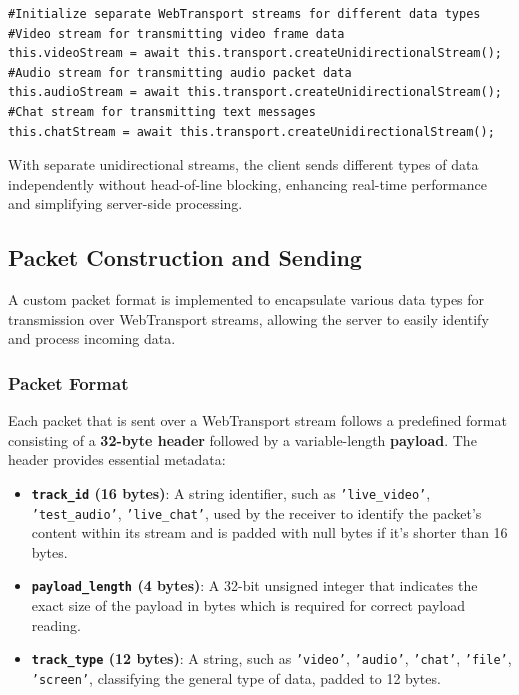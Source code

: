 \begin{lstlisting}[breaklines=true,basicstyle=\small\ttfamily,frame=single]
#Initialize separate WebTransport streams for different data types
#Video stream for transmitting video frame data
this.videoStream = await this.transport.createUnidirectionalStream();
#Audio stream for transmitting audio packet data  
this.audioStream = await this.transport.createUnidirectionalStream();
#Chat stream for transmitting text messages
this.chatStream = await this.transport.createUnidirectionalStream();
\end{lstlisting}

With separate unidirectional streams, the client sends different types of data independently without head-of-line blocking, enhancing real-time performance and simplifying server-side processing.

\subsection{Packet Construction and Sending}
A custom packet format is implemented to encapsulate various data types for transmission over WebTransport streams, allowing the server to easily identify and process incoming data.

\subsubsection{Packet Format}
Each packet that is sent over a WebTransport stream follows a predefined format consisting of a \textbf{32-byte header} followed by a variable-length \textbf{payload}. The header provides essential metadata:

\begin{itemize}
    \item \textbf{\texttt{track\_id} (16 bytes)}: A string identifier, such as \texttt{'live\_video'}, \texttt{'test\_audio'}, \texttt{'live\_chat'}, used by the receiver to identify the packet's content within its stream and is padded with null bytes if it's shorter than 16 bytes.
    \item \textbf{\texttt{payload\_length} (4 bytes)}: A 32-bit unsigned integer that indicates the exact size of the payload in bytes which is required for correct payload reading.
    \item \textbf{\texttt{track\_type} (12 bytes)}: A string, such as \texttt{'video'}, \texttt{'audio'}, \texttt{'chat'}, \texttt{'file'}, \texttt{'screen'}, classifying the general type of data, padded to 12 bytes.
\end{itemize}

